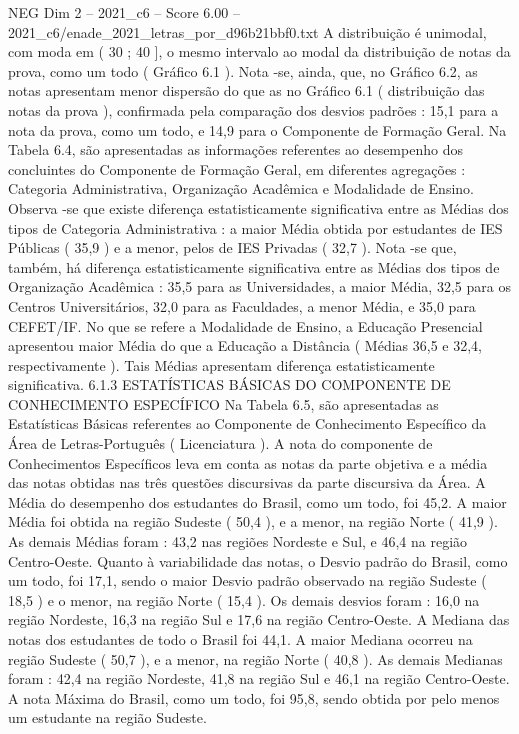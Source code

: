 \begin{textsample}{NEG Dim 2 – 2021\_c6 – Score 6.00 – 2021\_c6/enade\_2021\_letras\_por\_d96b21bbf0.txt}
A distribuição é unimodal, com moda em ( 30 ; 40 ], o mesmo intervalo ao modal da distribuição de notas da prova, como um todo ( Gráfico 6.1 ).
Nota -se, ainda, que, no Gráfico 6.2, as notas apresentam menor dispersão do que as no Gráfico 6.1 ( distribuição das notas da prova ), confirmada pela comparação dos desvios padrões : 15,1 para a nota da prova, como um todo, e 14,9 para o Componente de Formação Geral.
Na Tabela 6.4, são apresentadas as informações referentes ao desempenho dos concluintes do Componente de Formação Geral, em diferentes agregações : Categoria Administrativa, Organização Acadêmica e Modalidade de Ensino.
Observa -se que existe diferença estatisticamente significativa entre as Médias dos tipos de Categoria Administrativa : a maior Média obtida por estudantes de IES Públicas ( 35,9 ) e a menor, pelos de IES Privadas ( 32,7 ).
Nota -se que, também, há diferença estatisticamente significativa entre as Médias dos tipos de Organização Acadêmica : 35,5 para as Universidades, a maior Média, 32,5 para os Centros Universitários, 32,0 para as Faculdades, a menor Média, e 35,0 para CEFET/IF.
No que se refere a Modalidade de Ensino, a Educação Presencial apresentou maior Média do que a Educação a Distância ( Médias 36,5 e 32,4, respectivamente ).
Tais Médias apresentam diferença estatisticamente significativa. 6.1.3 ESTATÍSTICAS BÁSICAS DO COMPONENTE DE CONHECIMENTO ESPECÍFICO Na Tabela 6.5, são apresentadas as Estatísticas Básicas referentes ao Componente de Conhecimento Específico da Área de Letras-Português ( Licenciatura ).
A nota do componente de Conhecimentos Específicos leva em conta as notas da parte objetiva e a média das notas obtidas nas três questões discursivas da parte discursiva da Área.
A Média do desempenho dos estudantes do Brasil, como um todo, foi 45,2.
A maior Média foi obtida na região Sudeste ( 50,4 ), e a menor, na região Norte ( 41,9 ).
As demais Médias foram : 43,2 nas regiões Nordeste e Sul, e 46,4 na região Centro-Oeste.
Quanto à variabilidade das notas, o Desvio padrão do Brasil, como um todo, foi 17,1, sendo o maior Desvio padrão observado na região Sudeste ( 18,5 ) e o menor, na região Norte ( 15,4 ).
Os demais desvios foram : 16,0 na região Nordeste, 16,3 na região Sul e 17,6 na região Centro-Oeste.
A Mediana das notas dos estudantes de todo o Brasil foi 44,1.
A maior Mediana ocorreu na região Sudeste ( 50,7 ), e a menor, na região Norte ( 40,8 ).
As demais Medianas foram : 42,4 na região Nordeste, 41,8 na região Sul e 46,1 na região Centro-Oeste.
A nota Máxima do Brasil, como um todo, foi 95,8, sendo obtida por pelo menos um estudante na região Sudeste.

\end{textsample}
